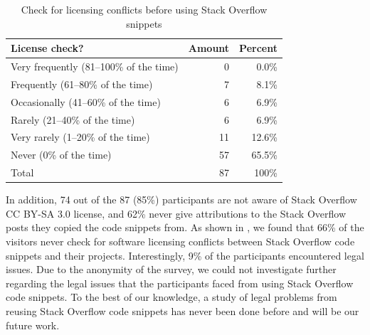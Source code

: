 \documentclass[10pt,journal,compsoc]{IEEEtran}
\begin{document}
\begin{table}
	\centering
	\caption{Check for licensing conflicts before using Stack Overflow snippets}
	\label{tab:visitor_survey_license_check}
	\begin{tabular}{lrr}
		\toprule
		License check? & Amount & Percent \\
		\midrule
		Very frequently (81--100\% of the time) & 0 & 0.0\% \\
		Frequently (61--80\% of the time) & 7 & 8.1\%
\\
		Occasionally (41--60\% of the time) & 6 & 6.9\%
\\
		Rarely (21--40\% of the time) & 6 & 6.9\% \\
		Very rarely (1--20\% of the time) & 11 & 12.6\% \\
		Never (0\% of the time)	& 57 & 65.5\% \\
		\midrule
		Total & 87 & 100\% \\
\bottomrule
\end{tabular}
\end{table}

In addition, 74 out of the 87 (85\%) participants are not
aware of Stack Overflow CC BY-SA 3.0 license, and 62\% never give attributions to
the Stack Overflow posts they copied the code snippets from. 
As shown in , we found that 66\%
of the visitors never check for software licensing conflicts between Stack
Overflow code snippets and their projects. Interestingly, 9\% of the
participants encountered legal issues. Due to the anonymity of
the survey, we could not investigate further regarding the legal issues that the
participants faced from using Stack Overflow code snippets.
To the best of our
knowledge, a study of legal problems from reusing Stack Overflow code snippets
has never been done before and will be our future work.

\end{document}
